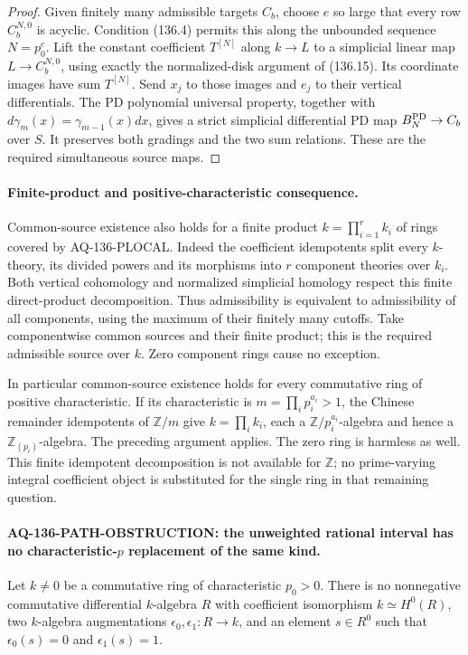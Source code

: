 \begin{proof}
Given finitely many admissible targets $C_b$, choose
$e$ so large that every row $C_b^{N,0}$ is acyclic.
Condition (136.4) permits this along the unbounded
sequence $N=p_0^e$.  Lift the constant coefficient
$T^{[N]}$ along $k\to L$ to a simplicial linear map
$L\to C_b^{N,0}$, using exactly the normalized-disk
argument of (136.15).  Its coordinate images have
sum $T^{[N]}$.  Send $x_j$ to those images and
$e_j$ to their vertical differentials.  The PD
polynomial universal property, together with
$d\gamma_m(x)=\gamma_{m-1}(x)dx$, gives a strict
simplicial differential PD map
$B_N^{\rm PD}\to C_b$ over $S$.
It preserves both gradings and the two sum relations.
These are the required simultaneous source maps.
\end{proof}

\paragraph{Finite-product and positive-characteristic consequence.}
Common-source existence also holds for a finite product
$k=\prod_{i=1}^r k_i$ of rings covered by AQ-136-PLOCAL.
Indeed the coefficient idempotents split every
$k$-theory, its divided powers and its morphisms into
$r$ component theories over $k_i$.
Both vertical cohomology and normalized simplicial
homology respect this finite direct-product decomposition.
Thus admissibility is equivalent to admissibility of all
components, using the maximum of their finitely many
cutoffs.  Take componentwise common sources and their
finite product; this is the required admissible source
over $k$.  Zero component rings cause no exception.

In particular common-source existence holds for every
commutative ring of positive characteristic.  If its
characteristic is $m=\prod_i p_i^{a_i}>1$, the Chinese
remainder idempotents of $\mathbb Z/m$ give
$k=\prod_i k_i$, each a $\mathbb Z/p_i^{a_i}$-algebra
and hence a $\mathbb Z_{(p_i)}$-algebra.  The preceding
argument applies.  The zero ring is harmless as well.
This finite idempotent decomposition is not available
for $\mathbb Z$; no prime-varying integral coefficient
object is substituted for the single ring in that
remaining question.

\paragraph{AQ-136-PATH-OBSTRUCTION: the unweighted rational interval has no characteristic-$p$ replacement of the same kind.}
Let $k\ne0$ be a commutative ring of characteristic
$p_0>0$.  There is no nonnegative commutative differential
$k$-algebra $R$ with coefficient isomorphism
$k\simeq H^0(R)$, two $k$-algebra augmentations
$\epsilon_0,\epsilon_1:R\to k$, and an element
$s\in R^0$ such that $\epsilon_0(s)=0$ and
$\epsilon_1(s)=1$.

